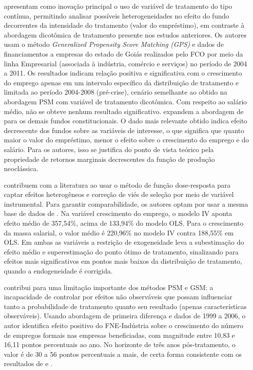  apresentam como inovação principal o uso de variável de tratamento do tipo contínua, permitindo analisar possíveis heterogeneidades no efeito do fundo decorrentes da intensidade do tratamento (valor do empréstimo), em contraste à abordagem dicotômica de tratamento presente nos estudos anteriores. Os autores usam o método \textit{Generalized Propensity Score Matching (GPS)} e dados de financiamentos a empresas do estado de Goiás realizados pelo FCO por meio da linha Empresarial (associada à indústria, comércio e serviços) no período de 2004 a 2011. Os resultados indicam relação positiva e significativa com o crescimento do emprego apenas em um intervalo específico da distribuição de tratamento e limitada ao período 2004-2008 (pré-crise), cenário semelhante ao obtido na abordagem PSM com variável de tratamento dicotômica. Com respeito ao salário médio, não se obteve nenhum resultado significativo.  expandem a abordagem de  para os demais fundos constitucionais. O dado mais relevante obtido indica efeito decrescente dos fundos sobre as variáveis de interesse, o que significa que quanto maior o valor do empréstimo, menor o efeito sobre o crescimento do emprego e do salário. Para os autores, isso se justifica do ponto de vista teórico pela propriedade de retornos marginais decrescentes da função de produção neoclássica.

 contribuem com a literatura ao usar o método de função dose-resposta para captar efeitos heterogêneos e correção de viés de seleção por meio de variável instrumental. Para garantir comparabilidade, os autores optam por usar a mesma base de dados de . Na variável crescimento do emprego, o modelo IV aponta efeito médio de 357,54\%, acima de 133,94\% do modelo OLS. Para o crescimento da massa salarial, o valor médio é 220,96\% no modelo IV contra 188,55\% em OLS. Em ambas as variáveis a restrição de exogeneidade leva a subestimação do efeito médio e superestimação do ponto ótimo de tratamento, sinalizando para efeitos mais significativos em pontos mais baixos da distribuição de tratamento, quando a endogeneidade é corrigida.

 contribui para uma limitação importante dos métodos PSM e GSM: a incapacidade de controlar por efeitos não observáveis que possam influenciar tanto a probabilidade de tratamento quanto seu resultado (apenas características observáveis). Usando abordagem de primeira diferença e dados de 1999 a 2006, o autor identifica efeito positivo do FNE-Indústria sobre o crescimento do número de empregos formais nas empresas beneficiadas, com magnitude entre 10,83 e 16,11 pontos percentuais ao ano. No horizonte de três anos pós-tratamento, o valor é de 30 a 56 pontos percentuais a mais, de certa forma consistente com os resultados de  e .

